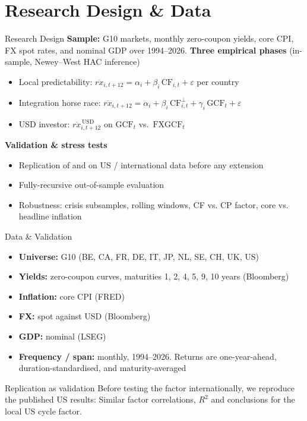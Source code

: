 \documentclass[10pt]{beamer}
\newcommand{\CF}{\mathrm{CF}}
\newcommand{\GCF}{\mathrm{GCF}}
\newcommand{\FXGCF}{\mathrm{FXGCF}}
\newcommand{\rxbar}{\overline{rx}}
\begin{document}
\section{Research Design \& Data}

\begin{frame}{Research Design}
  \textbf{Sample:} G10 markets, monthly zero-coupon yields, core CPI, FX spot
  rates, and nominal GDP over 1994--2026.
  \vfill
  \textbf{Three empirical phases} (in-sample, Newey--West HAC inference)
  \begin{itemize}
    \item[\textbf{I}] Local predictability:
      $\rxbar_{i,t+12}=\alpha_i+\beta_i\,\CF_{i,t}+\varepsilon$ per country
    \item[\textbf{II}] Integration horse race:
      $\rxbar_{i,t+12}=\alpha_i+\beta_i\,\CF^{\perp}_{i,t}
        +\gamma_i\,\GCF_{t}+\varepsilon$
    \item[\textbf{III}] USD investor:
      $\rxbar^{\,\mathrm{USD}}_{i,t+12}$ on $\GCF_{t}$ vs.\ $\FXGCF_{t}$
  \end{itemize}
  \vfill
  \textbf{Validation \& stress tests}
  \begin{itemize}
    \item Replication of \citet{cieslak2015} and \citet{dahlquist2013} on US /
      international data before any extension
    \item Fully-recursive out-of-sample evaluation
      \citep[Campbell--Thompson $R^{2}_{\mathrm{oos}}$,][]{campbellthompson2008}
    \item Robustness: crisis subsamples, rolling windows, CF vs. CP factor,
      core vs. headline inflation
  \end{itemize}
\end{frame}

\begin{frame}{Data \& Validation}
  \begin{itemize}
    \item \textbf{Universe:} G10 (BE, CA, FR, DE, IT, JP, NL, SE, CH, UK, US)
    \item \textbf{Yields:} zero-coupon curves, maturities 1, 2, 4, 5, 9, 10
      years (Bloomberg)
    \item \textbf{Inflation:} core CPI (FRED)
    \item \textbf{FX:}
      spot against USD (Bloomberg)
    \item \textbf{GDP:} nominal (LSEG)
    \item \textbf{Frequency / span:} monthly, 1994--2026. Returns are
      one-year-ahead, duration-standardised, and maturity-averaged
  \end{itemize}
  \vfill
  \begin{block}{Replication as validation}
    Before testing the factor internationally, we reproduce the published US results: Similar factor correlations, $R^2$ and conclusions for the local US cycle factor.
  \end{block}
\end{frame}
\end{document}
